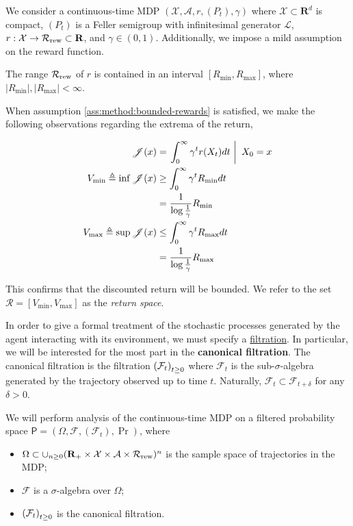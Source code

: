 We consider a continuous-time MDP $(\mathcal{X}, \mathcal{A}, r,
(P_t), \gamma)$ where $\mathcal{X}\subset\mathbf{R}^d$ is compact,
$(P_t)$ is a Feller semigroup with infinitesimal generator
$\mathscr{L}$, $r: \mathcal{X}\to\rewardspace\subset\mathbf{R}$, and
$\gamma\in(0,1)$. Additionally, we impose a mild assumption on the reward
function.

\begin{assumption}\label{ass:method:bounded-rewards}
  The range $\rewardspace$ of $r$ is contained in an
  interval $[R_{\min}, R_{\max}]$, where $|R_{\min}|,|R_{\max}| <\infty$.
\end{assumption}

When assumption \ref{ass:method:bounded-rewards} is satisfied, we make
the following observations regarding the extrema of the return,

\begin{equation*}
  \begin{aligned}
    \returnfunction(x) &= \Conditional{\int_0^\infty\gamma^tr(X_t)dt}{X_0 = x}\\
    V_{\min}\triangleq\inf \returnfunction(x)&\geq\int_0^\infty\gamma^tR_{\min}dt\\
    &= \frac{1}{\log\frac{1}{\gamma}}R_{\min}\\
    V_{\max}\triangleq\sup \returnfunction(x)&\leq\int_0^\infty\gamma^tR_{\max}dt\\
    &= \frac{1}{\log\frac{1}{\gamma}}R_{\max}\\
  \end{aligned}
\end{equation*}

This confirms that the discounted return will be bounded. We refer to
the set $\mathcal{R} = [V_{\min}, V_{\max}]$ as the \emph{return
  space}.

In order to give a formal treatment of the stochastic processes
generated by the agent interacting with its environment, we must
specify a \hyperref[def:filtration]{filtration}.
In particular, we will be interested for the most part in
the \label{def:canonical-filtration}\textbf{canonical filtration}. The
canonical filtration is the filtration $\indexedabove{t}{\mathcal{F}}$
where $\mathcal{F}_t$ is the sub-$\sigma$-algebra generated by the
trajectory observed up to time $t$. Naturally,
$\mathcal{F}_t\subset\mathcal{F}_{t+\delta}$ for any $\delta>0$.

We will perform analysis of the continuous-time MDP on a filtered
probability space \label{def:probability-space}$\mathsf{P} = (\Omega,
\mathcal{F}, (\mathcal{F}_t), \Pr)$, where 
\begin{itemize}
\item $\Omega \subset
  \cup_{n\geq 0}(\mathbf{R}_+\times\mathcal{X}\times\mathcal{A}\times\rewardspace)^n$ is
  the sample space of trajectories in the MDP;
\item $\mathcal{F}$ is a $\sigma$-algebra over $\Omega$;
\item $\indexedabove{t}{\mathcal{F}}$ is the canonical filtration.
\end{itemize}


